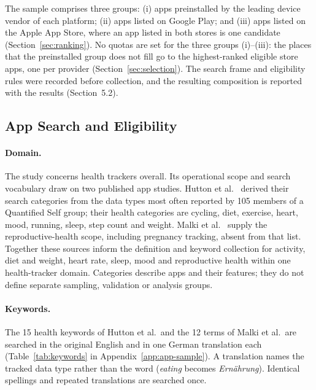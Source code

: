 The sample comprises three groups: \textcolor{accent}{(i)} apps preinstalled
by the leading device vendor of each platform; \textcolor{accent}{(ii)} apps listed on
Google Play; and \textcolor{accent}{(iii)} apps listed on the Apple App Store, where an app
listed in both stores is one candidate (Section~\ref{sec:ranking}).
No quotas are set for the three groups
\textcolor{accent}{(i)}--\textcolor{accent}{(iii)}: the places that the preinstalled group does
not fill go to the highest-ranked eligible store apps, one per provider
(Section~\ref{sec:selection}). The search frame and eligibility rules
were recorded before collection, and the resulting composition is reported with the results
(Section~5.2).

\subsection{App Search and Eligibility}
\label{sec:app-search}
\paragraph{Domain.} The study concerns health trackers overall. Its operational
scope and search vocabulary draw on two published app studies. Hutton et
al.~\parencite{hutton2018assessing} derived their search categories from the
data types most often reported by 105 members of a Quantified Self group;
their health categories are cycling, diet, exercise, heart, mood, running,
sleep, step count and weight. Malki et
al.~\parencite{malki2024exploring} supply the reproductive-health scope,
including pregnancy tracking, absent from that list. Together these sources
inform the definition and keyword collection for activity, diet and weight,
heart rate, sleep, mood and reproductive health within one health-tracker
domain. Categories describe apps and their features; they do not define
separate sampling, validation or analysis groups.

\paragraph{Keywords.} The 15 health keywords of Hutton et al.\ and the 12
terms of Malki et al.\ are searched in the original English and in one German
translation each (Table~\ref{tab:keywords} in Appendix~\ref{app:app-sample}). A translation names the tracked
data type rather than the word (\emph{eating} becomes \emph{Ernährung}).
Identical spellings and repeated translations are searched once.

